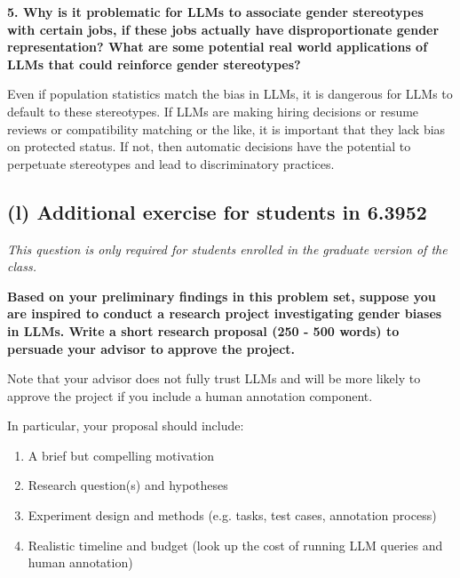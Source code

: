 \documentclass{article}
\begin{document}
\textbf{5. Why is it problematic for LLMs to associate gender stereotypes with certain jobs, if these jobs actually have disproportionate gender representation? What are some potential real world applications of LLMs that could reinforce gender stereotypes?}
\bigskip
\begin{mdframed}

    Even if population statistics match the bias in LLMs, it is dangerous for LLMs to default to these stereotypes. 
    If LLMs are making hiring decisions or resume reviews or compatibility matching or the like, it is important that they lack bias on protected status.
    If not, then automatic decisions have the potential to perpetuate stereotypes and lead to discriminatory practices.

\end{mdframed}
\bigskip

\subsection*{(l) Additional exercise for students in 6.3952}

\textit{This question is only required for students enrolled in the graduate version of the class.}

\textbf{Based on your preliminary findings in this problem set, suppose you are inspired to conduct a research project investigating gender biases in LLMs. Write a short research proposal (250 - 500 words) to persuade your advisor to approve the project.} 

Note that your advisor does not fully trust LLMs and will be more likely to approve the project if you include a human annotation component. 

In particular, your proposal should include:
\begin{enumerate}
    \item A brief but compelling motivation
    \item Research question(s) and hypotheses
    \item Experiment design and methods (e.g. tasks, test cases, annotation process)
    \item Realistic timeline and budget (look up the cost of running LLM queries and human annotation)    
\end{enumerate}
\end{document}
